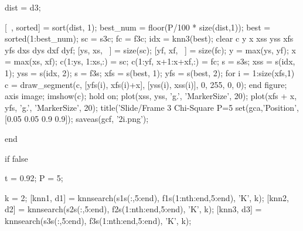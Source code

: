 dist = d3;

[~, sorted] = sort(dist, 1);
best_num = floor(P/100 * size(dist,1));
best = sorted(1:best_num);
sc = s3c;
fc = f3c;
idx = knn3(best);
clear c y x xss yss xfs yfs dxs dys dxf dyf;
[ys, xs, ~] = size(sc);
[yf, xf, ~] = size(fc);
y = max(ys, yf);
x = max(xs, xf);
c(1:ys, 1:xs,:) = sc;
c(1:yf, x+1:x+xf,:) = fc;
s = s3s;
xss = s(idx, 1);
yss = s(idx, 2);
s = f3s;
xfs = s(best, 1);
yfs = s(best, 2);
for i = 1:size(xfs,1)
    c = draw_segment(c, [yfs(i), xfs(i)+x], [yss(i), xss(i)], 0, 255, 0, 0);
end
figure;
axis image;
imshow(c);
hold on;
plot(xss, yss, 'g.', 'MarkerSize', 20);
plot(xfs + x, yfs, 'g.', 'MarkerSize', 20);
title('Slide/Frame 3 Chi-Square P=5%
set(gca,'Position', [0.05 0.05 0.9 0.9]);
saveas(gcf, '2i.png');

end


if false

t = 0.92;
P = 5;

k = 2;    
[knn1, d1] = knnsearch(s1s(:,5:end), f1s(1:nth:end,5:end), 'K', k);
[knn2, d2] = knnsearch(s2s(:,5:end), f2s(1:nth:end,5:end), 'K', k);
[knn3, d3] = knnsearch(s3s(:,5:end), f3s(1:nth:end,5:end), 'K', k);

